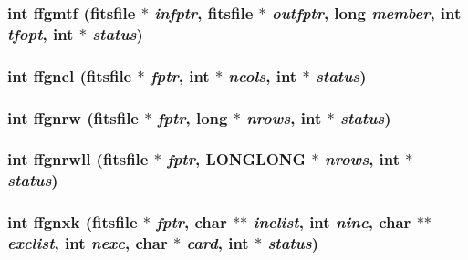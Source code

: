 \subsubsection{\setlength{\rightskip}{0pt plus 5cm}int ffgmtf (\bf{fitsfile} $\ast$ {\em infptr}, \bf{fitsfile} $\ast$ {\em outfptr}, long {\em member}, int {\em tfopt}, int $\ast$ {\em status})}\label{fitsio__64_8h_f4e42cd31baf4733160bd227bd307256}


\subsubsection{\setlength{\rightskip}{0pt plus 5cm}int ffgncl (\bf{fitsfile} $\ast$ {\em fptr}, int $\ast$ {\em ncols}, int $\ast$ {\em status})}\label{fitsio__64_8h_766397cd4633ce4b408f9830062893ed}


\subsubsection{\setlength{\rightskip}{0pt plus 5cm}int ffgnrw (\bf{fitsfile} $\ast$ {\em fptr}, long $\ast$ {\em nrows}, int $\ast$ {\em status})}\label{fitsio__64_8h_92e123ff738eb16143c6f5aa1417aad7}


\subsubsection{\setlength{\rightskip}{0pt plus 5cm}int ffgnrwll (\bf{fitsfile} $\ast$ {\em fptr}, \bf{LONGLONG} $\ast$ {\em nrows}, int $\ast$ {\em status})}\label{fitsio__64_8h_de18b919b0b4fec8c16e56126d3fb0a0}


\subsubsection{\setlength{\rightskip}{0pt plus 5cm}int ffgnxk (\bf{fitsfile} $\ast$ {\em fptr}, char $\ast$$\ast$ {\em inclist}, int {\em ninc}, char $\ast$$\ast$ {\em exclist}, int {\em nexc}, char $\ast$ {\em card}, int $\ast$ {\em status})}\label{fitsio__64_8h_19ff4531fbaa18e5979fb079215ad5ce}


